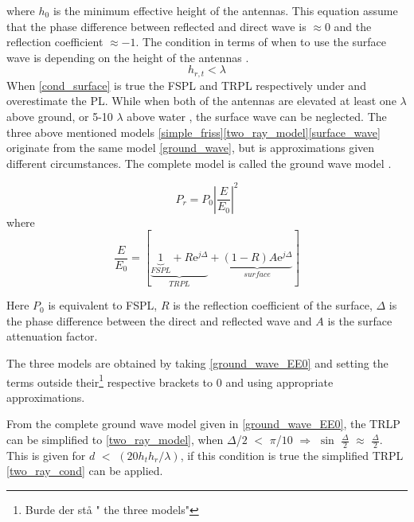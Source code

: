 where $h_0$ is the minimum effective height of the antennas.  This equation assume that the phase difference between reflected and direct wave is $\approx 0$ and the reflection coefficient $\approx -1$. The condition in terms of when to use the surface wave is depending on the height of the antennas \cite{Chong}.
\begin{equation}
h_{r,t} < \lambda
\label{cond_surface}
\end{equation}
When \eqref{cond_surface} is true the FSPL and TRPL respectively under and overestimate the PL.
While when both of the antennas are elevated at least one $\lambda$ above ground, or 5-10 $\lambda$ above water \cite{Chong}, the surface wave can be neglected. 
The three above mentioned models \eqref{simple_friss}\eqref{two_ray_model}\eqref{surface_wave} originate from the same model \eqref{ground_wave}, but is approximations given different circumstances. The complete model is called the ground wave model \cite{Chong,Bullington}. %


\begin{equation}
P_r=P_0 \left|\frac{E}{E_0}\right|^2 
\label{ground_wave}
\end{equation}
where
\begin{equation}
\frac{E}{E_{0}}=[\underbrace{\underbrace{1}_{FSPL}+R\text{e}^{j\Delta}}_{TRPL}+\underbrace{(1-R)A\text{e}^{j\Delta}}_{surface}]
\label{ground_wave_EE0}
\end{equation}

Here $P_{0}$ is equivalent to FSPL, $R$ is the reflection coefficient of the surface, $\Delta$ is the phase difference between the direct and reflected wave and $A$ is the surface attenuation factor.

The three models are obtained by taking \eqref{ground_wave_EE0} and setting the terms outside their\footnote{Burde der stå " the three models"} respective brackets to 0 and using appropriate approximations.

From the complete ground wave model given in \eqref{ground_wave_EE0}, the TRLP can be simplified to \eqref{two_ray_model}, 
when $\Delta$/$2$ $<$ $\pi$/$10$ $\Rightarrow$ $\sin$ $\frac{\Delta}{2}$ $\approx$ $\frac{\Delta}{2}$. This is given for $d$ $<$ $(20h_{t}h_{r}/\lambda)$, if this condition is true the simplified TRPL \eqref{two_ray_cond} can be applied.  
  

